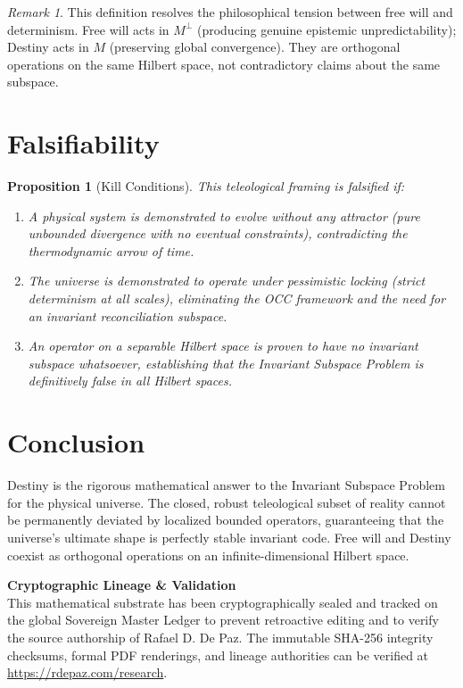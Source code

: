 \documentclass[12pt, a4paper]{article}
\theoremstyle{plain}
\newtheorem{proposition}[theorem]{Proposition}
\theoremstyle{definition}
\theoremstyle{remark}
\newtheorem{remark}[theorem]{Remark}
\begin{document}
\begin{remark}
This definition resolves the philosophical tension between free will and determinism. Free will acts in $M^\perp$ (producing genuine epistemic unpredictability); Destiny acts in $M$ (preserving global convergence). They are orthogonal operations on the same Hilbert space, not contradictory claims about the same subspace.
\end{remark}

\section{Falsifiability}\label{sec:falsifiability}

\begin{proposition}[Kill Conditions]
This teleological framing is falsified if:
\begin{enumerate}
    \item A physical system is demonstrated to evolve without any attractor (pure unbounded divergence with no eventual constraints), contradicting the thermodynamic arrow of time.
    \item The universe is demonstrated to operate under pessimistic locking (strict determinism at all scales), eliminating the OCC framework and the need for an invariant reconciliation subspace.
    \item An operator on a separable Hilbert space is proven to have no invariant subspace whatsoever, establishing that the Invariant Subspace Problem is definitively false in all Hilbert spaces.
\end{enumerate}
\end{proposition}

\section{Conclusion}

Destiny is the rigorous mathematical answer to the Invariant Subspace Problem for the physical universe. The closed, robust teleological subset of reality cannot be permanently deviated by localized bounded operators, guaranteeing that the universe's ultimate shape is perfectly stable invariant code. Free will and Destiny coexist as orthogonal operations on an infinite-dimensional Hilbert space.

\vspace{2em}
\noindent\hrulefill
\vspace{1em}

\noindent\textbf{Cryptographic Lineage \& Validation}\\
This mathematical substrate has been cryptographically sealed and tracked on the global Sovereign Master Ledger to prevent retroactive editing and to verify the source authorship of Rafael D. De Paz. The immutable SHA-256 integrity checksums, formal PDF renderings, and lineage authorities can be verified at \url{https://rdepaz.com/research}.



\end{document}
